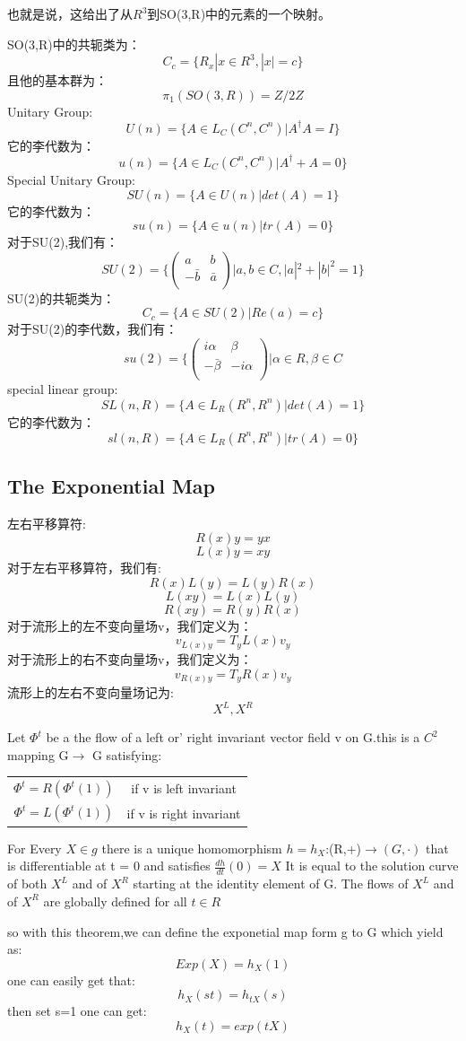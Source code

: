 也就是说，这给出了从$R^3$到SO(3,R)中的元素的一个映射。\par
SO(3,R)中的共轭类为：
\[C_c=\{R_x|x\in R^3,|x|=c\}\]
且他的基本群为：
\[\pi_1(SO(3,R))=Z/2Z\]
Unitary Group:
\[U(n)=\{A\in L_C(C^n,C^n)|A^\dagger A=I\}\]
它的李代数为：
\[u(n)=\{A\in L_C(C^n,C^n)|A^\dagger+A=0\}\]
Special Unitary Group:
\[SU(n)=\{A\in U(n)|det(A)=1\}\]
它的李代数为：
\[su(n)=\{A\in u(n)|tr(A)=0\}\]
对于SU(2),我们有：
\[SU(2)=\{\left(\begin{array}{cc}a&b\\-\bar{b}&\bar{a}\\\end{array}\right)|a,b\in C,|a|^2+|b|^2=1\}\]
SU(2)的共轭类为：
\[C_c=\{A\in SU(2)|Re(a)=c\}\]
对于SU(2)的李代数，我们有：
\[su(2)=\{\left(\begin{array}{cc}i\alpha&\beta\\-\bar{\beta}&-i\alpha\\\end{array}\right)|\alpha\in R,\beta\in C\]
special linear group:
\[SL(n,R)=\{A\in L_R(R^n,R^n)|det(A)=1\}\]
它的李代数为：
\[sl(n,R)=\{A\in L_R(R^n,R^n)|tr(A)=0\}\]

\subsection{The Exponential Map}
左右平移算符:
\[R(x)y=yx\]
\[L(x)y=xy\]
对于左右平移算符，我们有:
\[R(x)L(y)=L(y)R(x)\]
\[L(xy)=L(x)L(y)\]
\[R(xy)=R(y)R(x)\]
对于流形上的左不变向量场v，我们定义为：
\[v_{L(x)y}=T_yL(x)v_y\]
对于流形上的右不变向量场v，我们定义为：
\[v_{R(x)y}=T_yR(x)v_y\]
流形上的左右不变向量场记为:
\[X^L,X^R\]
\begin{lemma}
Let $\Phi^t$ be a  the flow of a left or' right invariant vector field v on G.this is a $C^2$ mapping G$\rightarrow$ G satisfying:\par
\begin{center}
\begin{tabular}{cc}
$\Phi^t=R(\Phi^t(1))$&if v is left invariant\\
$\Phi^t=L(\Phi^t(1))$&if v is right invariant\\
\end{tabular}
\end{center}
\end{lemma}

\begin{theorem}
For Every $X\in g$ there is a unique homomorphism $h=h_X$:(R,+)$\rightarrow (G,\cdot)$ that is differentiable at t = 0 and satisfies $\frac{dh}{dt}(0)=X$ It is equal to the solution curve of both $X^L$ and of $X^R$ starting at the identity element of G. The flows of $X^L$ and of $X^R$ are globally defined for all $t \in R$
\end{theorem}
so with this theorem,we can define the exponetial map form g to G which yield as:
\[Exp(X)=h_X(1)\]
one can easily get that:
\[h_X(st)=h_{tX}(s)\]
then set s=1 one can get:
\[h_X(t)=exp(tX)\]

